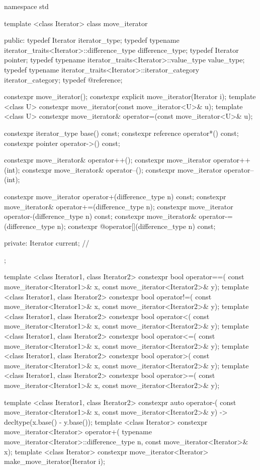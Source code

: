 %
\begin{codeblock}
namespace std {
  template <class Iterator>
  class move_iterator {
  public:
    typedef Iterator                                              iterator_type;
    typedef typename iterator_traits<Iterator>::difference_type   difference_type;
    typedef Iterator                                              pointer;
    typedef typename iterator_traits<Iterator>::value_type        value_type;
    typedef typename iterator_traits<Iterator>::iterator_category iterator_category;
    typedef @\seebelownc@                                             reference;

    constexpr move_iterator();
    constexpr explicit move_iterator(Iterator i);
    template <class U> constexpr move_iterator(const move_iterator<U>& u);
    template <class U> constexpr move_iterator& operator=(const move_iterator<U>& u);

    constexpr iterator_type base() const;
    constexpr reference operator*() const;
    constexpr pointer operator->() const;

    constexpr move_iterator& operator++();
    constexpr move_iterator operator++(int);
    constexpr move_iterator& operator--();
    constexpr move_iterator operator--(int);

    constexpr move_iterator operator+(difference_type n) const;
    constexpr move_iterator& operator+=(difference_type n);
    constexpr move_iterator operator-(difference_type n) const;
    constexpr move_iterator& operator-=(difference_type n);
    constexpr @\unspec@ operator[](difference_type n) const;

  private:
    Iterator current;   // \expos
  };

  template <class Iterator1, class Iterator2>
    constexpr bool operator==(
      const move_iterator<Iterator1>& x, const move_iterator<Iterator2>& y);
  template <class Iterator1, class Iterator2>
    constexpr bool operator!=(
      const move_iterator<Iterator1>& x, const move_iterator<Iterator2>& y);
  template <class Iterator1, class Iterator2>
    constexpr bool operator<(
      const move_iterator<Iterator1>& x, const move_iterator<Iterator2>& y);
  template <class Iterator1, class Iterator2>
    constexpr bool operator<=(
      const move_iterator<Iterator1>& x, const move_iterator<Iterator2>& y);
  template <class Iterator1, class Iterator2>
    constexpr bool operator>(
      const move_iterator<Iterator1>& x, const move_iterator<Iterator2>& y);
  template <class Iterator1, class Iterator2>
    constexpr bool operator>=(
      const move_iterator<Iterator1>& x, const move_iterator<Iterator2>& y);

  template <class Iterator1, class Iterator2>
    constexpr auto operator-(
      const move_iterator<Iterator1>& x,
      const move_iterator<Iterator2>& y) -> decltype(x.base() - y.base());
  template <class Iterator>
    constexpr move_iterator<Iterator> operator+(
      typename move_iterator<Iterator>::difference_type n, const move_iterator<Iterator>& x);
  template <class Iterator>
    constexpr move_iterator<Iterator> make_move_iterator(Iterator i);
}
\end{codeblock}

